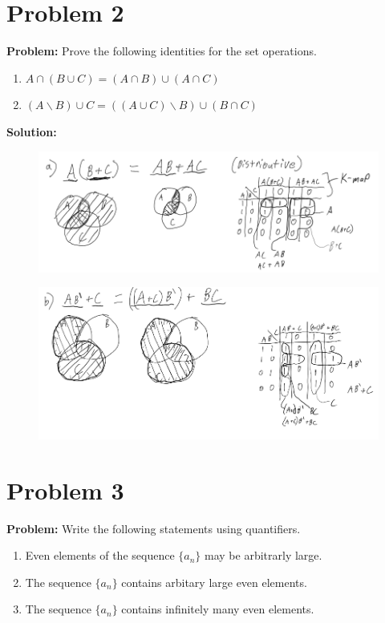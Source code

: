 \documentclass[]{article}
\begin{document}
\newpage
\section{Problem 2}
\textbf{Problem:}
Prove the following identities for the set operations.
\begin{enumerate}
	\item $A \cap (B \cup C) = (A \cap B) \cup (A \cap C)$
	\item $(A \backslash B) \cup C = ((A \cup C) \backslash B) \cup (B \cap C)$
\end{enumerate}

\textbf{Solution:}
\begin{figure}[h]
	\centering
	\includegraphics*[width = \textwidth]{fig/pblm2a.png}
\end{figure}

\begin{figure}[h]
	\centering
	\includegraphics*[width = \textwidth]{fig/pblm2b.png}
\end{figure}

\newpage
\section{Problem 3}
\textbf{Problem:}
Write the following statements using quantifiers.
\begin{enumerate}
	\item Even elements of the sequence $\{a_n\}$ may be arbitrarly large.
	\item The sequence $\{a_n\}$ contains arbitary large even elements.
	\item The sequence $\{a_n\}$ contains infinitely many even elements.
\end{enumerate}
\end{document}

